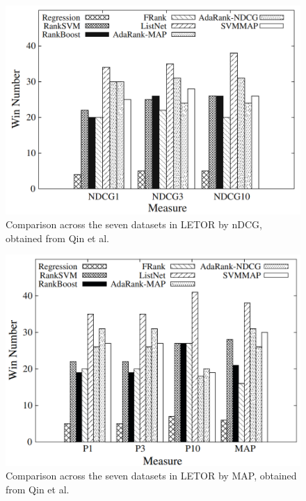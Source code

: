 \begin{figure}[!h]
\includegraphics[scale=0.30]{gfx/ndcg_winning_number}
\caption{Comparison across the seven datasets in LETOR by \acs{nDCG}, obtained from Qin et al. \cite{Qin2010}}
\label{fig:ndcg_winning_number}
\end{figure}

\begin{figure}[!h]
\includegraphics[scale=0.30]{gfx/map_winning_number}
\caption{Comparison across the seven datasets in LETOR by \acs{MAP}, obtained from Qin et al. \cite{Qin2010}}
\label{fig:map_winning_number}
\end{figure}

